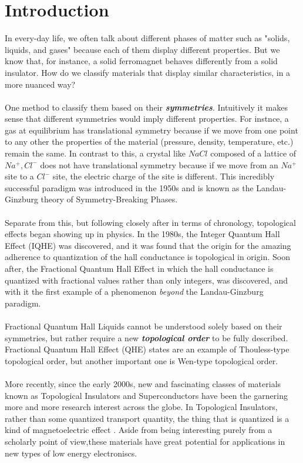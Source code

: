 \documentclass[11pt]{article}
\begin{document}
\section{Introduction}
In every-day life, we often talk about different phases of matter such as "solids, liquids, and gases" because each of them display different properties. But we know that, for instance, a solid ferromagnet behaves differently from a solid insulator. How do we classify materials that display similar characteristics, in a more nuanced way? 
\\
\\
One method to classify them based on their \textbf{\emph{symmetries}}. Intuitively it makes sense that different symmetries would imply different properties. For instnce, a gas at equilibrium has translational symmetry because if we move from one point to any other the properties of the material (pressure, density, temperature, etc.) remain the same. In contrast to this, a crystal like $NaCl$ composed of a lattice of $Na^+, Cl^-$ does not have translational symmetry because if we move from an $Na^+$ site to a $Cl^-$ site, the electric charge of the site is different. This incredibly successful paradigm was introduced in the 1950s and is known as the Landau-Ginzburg theory of Symmetry-Breaking Phases.
\\
\\
Separate from this, but following closely after in terms of chronology, topological effects began showing up in physics. In the 1980s, the Integer Quantum Hall Effect (IQHE) was discovered, and it was found that the origin for the amazing adherence to quantization of the hall conductance is topological in origin. Soon after, the Fractional Quantum Hall Effect in which the hall conductance is quantized with fractional values rather than only integers, was discovered, and with it the first example of a phenomenon \emph{beyond} the Landau-Ginzburg paradigm. 
\\
\\
Fractional Quantum Hall Liquids cannot be understood solely based on their symmetries, but rather require a new \textbf{\emph{topological order}} to be fully described. Fractional Quantum Hall Effect (QHE) states are an example of Thouless-type topological order, but another important one is Wen-type topological order. 
\\
\\
More recently, since the early 2000s, new and fascinating classes of materials known as Topological Insulators and Superconductors have been the garnering more and more research interest across the globe. In Topological Insulators, rather than some quantized transport quantity, the thing that is quantized is a kind of magnetoelectric effect \cite{MooreMoessner21}. Aside from being interesting purely from a scholarly point of view,these materials have great potential for applications in new types of low energy electroniscs. 
\end{document}
